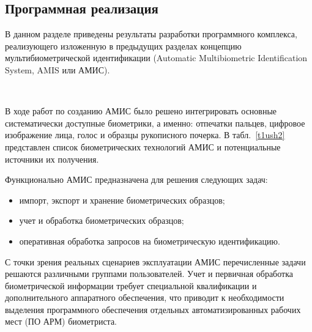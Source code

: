\begin{multicols}{2}
\vspace*{-8pt}
  
  \section{Программная реализация}
  
  В данном разделе приведены результаты разра\-бот\-ки программного 
комплекса, реализующего изложенную в предыдущих разделах концепцию %
мультибиометрической идентификации (Auto\-matic Multibiometric Identification 
System, AMIS или АМИС).


  \begin{figure*} %
\vspace*{1pt}
\begin{center}
\mbox{%
\epsfxsize=163.817mm  
 }
\end{center}
\vspace*{-6pt}
  \end{figure*}
  
    В ходе работ по созданию АМИС было решено интегрировать основные 
систематически доступные биометрики, а именно: отпечатки пальцев, 
цифровое изображение лица, голос и образцы рукописного почерка. В 
табл.~\ref{t1ush2} представлен список биометрических технологий АМИС и 
потенциальные источники их получения.
  
  
  Функционально АМИС предназначена для решения следующих задач:
  \begin{itemize}
\item импорт, экспорт и хранение биометрических образцов;\\[-13pt]
\item учет и обработка биометрических образцов;\\[-13pt]
\item оперативная обработка запросов на биометрическую 
идентификацию.\\[-13pt]
\end{itemize}
  
  С точки зрения реальных сценариев эксплуатации АМИС перечисленные 
задачи решаются различ\-ны\-ми группами пользователей. Учет и первичная 
обработка биометрической информации %
требует специальной квалификации и 
дополнительного аппаратного обеспечения, что приводит к необходимости 
выделения программного обеспечения отдельных автоматизированных рабочих 
мест (ПО АРМ) биометриста. 
  

\end{multicols}
